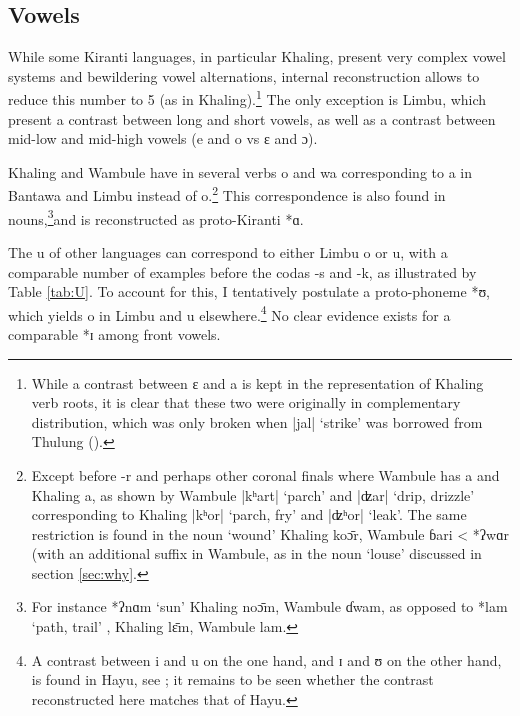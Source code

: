 \documentclass[oneside,a4paper,11pt]{article}
\newcommand{\ipa}[1]{{\phon\mbox{#1}}} %
\newcommand{\dhatu}[2]{|\ipa{#1}| `#2'}
\begin{document}
\subsection{Vowels} \label{sec:vowels}

While some Kiranti languages, in particular Khaling, present very complex vowel systems and bewildering vowel alternations, internal reconstruction allows to reduce this number to 5 (as in Khaling).\footnote{While a contrast between \ipa{ɛ} and \ipa{a} is kept in the representation of Khaling verb roots, it is clear that these two were originally in complementary distribution, which was only broken when \dhatu{jal}{strike} was borrowed from Thulung (\citealt[1110]{jacques12khaling}).} The only exception is Limbu, which present a contrast between long and short vowels, as well as a contrast between mid-low and mid-high vowels (\ipa{e} and \ipa{o} vs \ipa{ɛ} and \ipa{ɔ}).  

Khaling and Wambule have in several verbs \ipa{o} and \ipa{wa} corresponding to \ipa{a} in Bantawa and Limbu instead of \ipa{o}.\footnote{Except before \ipa{-r} and perhaps other coronal finals where Wambule has \ipa{a} and Khaling \ipa{a}, as shown by Wambule \dhatu{kʰart}{parch}	 	
and \dhatu{ʣar}{drip, drizzle}	corresponding to Khaling 	\dhatu{kʰor}{parch, fry} and \dhatu{ʣʰor}{leak}. The same restriction is found in the noun `wound' Khaling \ipa{koɔ̄r}, Wambule \ipa{ɓari} < *\ipa{ʔwɑr} (with an additional suffix in Wambule, as in the noun `louse' discussed in section \ref{sec:why}.} This correspondence is also found in nouns,\footnote{For instance *\ipa{ʔnɑm} `sun'  Khaling \ipa{noɔ̄m}, Wambule \ipa{ɗwam}, as opposed to *\ipa{lam} `path, trail' , Khaling \ipa{lɛ̄m}, Wambule \ipa{lam}.}and is reconstructed as proto-Kiranti *\ipa{ɑ}.

The \ipa{u} of other languages can correspond to either Limbu \ipa{o} or \ipa{u}, with a comparable number of examples before the codas \ipa{-s} and \ipa{-k}, as illustrated by Table \ref{tab:U}. To account for this, I tentatively postulate a proto-phoneme *\ipa{ʊ}, which yields \ipa{o} in Limbu and \ipa{u} elsewhere.\footnote{A contrast between \ipa{i} and \ipa{u} on the one hand, and \ipa{ɪ} and \ipa{ʊ} on the other hand, is found in Hayu, see \citet{michailovsky88}; it remains to be seen whether the contrast reconstructed here matches that of Hayu. } No clear evidence exists for a comparable *\ipa{ɪ} among front vowels.
\end{document}
